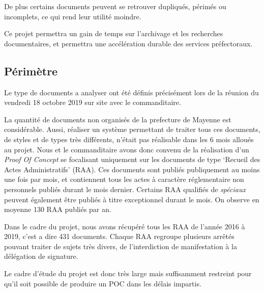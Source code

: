 De plus certains documents peuvent se retrouver dupliqués, périmés ou incomplets, ce qui rend leur utilité moindre.

Ce projet permettra un gain de temps sur l'archivage et les recherches documentaires, et permettra une accélération durable des services préfectoraux.


\subsection{Périmètre}
Le type de documents a analyser ont été définis précisément lors de la réunion du vendredi 18 octobre 2019 sur site avec le commanditaire.

La quantité de documents non organisés de la prefecture de Mayenne est considérable.
Aussi, réaliser un système permettant de traiter tous ces documents, de styles et de types très différents, n'était pas réalisable dans les 6 mois alloués au projet.
Nous et le commanditaire avons donc convenu de la réalisation d'un \textit{Proof Of Concept} se focalisant uniquement sur les documents de type `Recueil des Actes Administratifs' (RAA).
Ces documents sont publiés publiquement au moins une fois par mois, et contiennent tous les actes à caractère réglementaire non personnels publiés durant le mois dernier.
Certains RAA qualifiés de \textit{spéciaux} peuvent également être publiés à titre exceptionnel durant le mois.
On observe en moyenne 130 RAA publiés par an.

Dans le cadre du projet, nous avons récupéré tous les RAA de l'année 2016 à 2019, c'est a dire 431 documents.
Chaque RAA regroupe plusieurs arrêtés pouvant traiter de sujets très divers, de l'interdiction de manifestation à la délégation de signature.

Le cadre d'étude du projet est donc très large mais suffisamment restreint pour qu'il soit possible de produire un POC dans les délais impartis. 
